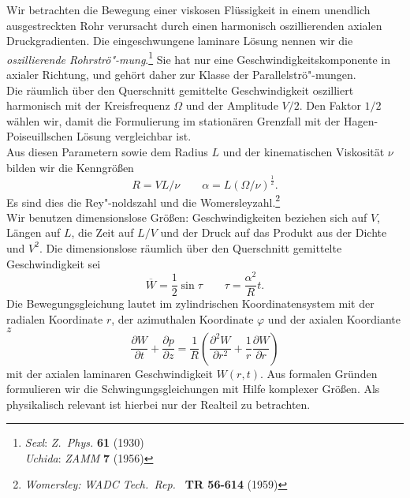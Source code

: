 \documentclass[10pt,a5paper,oneside,draft]{book}
\numberwithin{equation}{chapter}
\def\bibspace{\hspace*{18pt}}
\def\bibspace{\hspace*{21pt}}
\begin{document}
Wir betrachten die Bewegung einer viskosen Fl\"ussigkeit in einem unendlich ausgestreckten Rohr verursacht durch einen harmonisch oszillierenden axialen Druckgradienten.
Die eingeschwungene laminare L\"osung nennen wir die \textit{oszillierende Rohrstr\"o"-mung}.\footnote{\label{bib:sexl2}\textsl{Sexl}: \textit{Z.\ Phys.} \textbf{61} (1930)\\\bibspace\label{bib:uchida}\textsl{Uchida}: \textit{ZAMM} \textbf{7} (1956)} Sie hat nur eine Geschwindigkeitskomponente in axialer Richtung, und geh\"ort daher zur Klasse der Parallelstr\"o"-mungen.\\
Die r\"aumlich \"uber den Querschnitt gemittelte Geschwindigkeit oszilliert harmonisch mit der Kreisfrequenz $\Omega$ und der Amplitude $V/2$.
Den Faktor $1/2$ w\"ahlen wir, damit die Formulierung im station\"aren Grenzfall mit der Hagen-Poiseuillschen L\"osung vergleichbar ist.\\
Aus diesen Parametern sowie dem Radius $L$ und der kinematischen Viskosit\"at $\nu$ bilden wir die Kenngr\"o\ss en
\begin{equation}
	R = VL/\nu \qquad \alpha = L \left(\Omega/\nu\right)^{\frac{1}{2}}.
\end{equation}
Es sind dies die Rey"-noldszahl und die Womersleyzahl.\footnote{\label{bib:womersley_rep}\textsl{Womersley:} \textit{WADC Tech.\ Rep.\ } \textbf{TR 56-614} (1959)}\\
Wir benutzen dimensionslose Gr\"o\ss en: Geschwindigkeiten beziehen sich auf $V\!$, L\"angen auf $L$, die Zeit auf $L/V$ und der Druck auf das Produkt aus der Dichte und $V^2$.
Die dimensionslose r\"aumlich \"uber den Querschnitt gemittelte Geschwindigkeit sei
\begin{equation}\label{eq:baseflow-barV}
	\overline W = \frac{1}{2} \sin \tau \qquad \tau = \frac{\alpha^2}{R}t.
\end{equation}
Die Bewegungsgleichung lautet im zylindrischen Koordinatensystem mit der radialen Koordinate $r$, der azimuthalen Koordinate $\varphi$ und der axialen Koordiante $z$
\begin{equation}
	  \frac{\partial{W}}{\partial t} +  \frac{\partial{p}}{\partial z} = \frac{1}{R}\left(  \frac{\partial^{2}{W}}{\partial r^2} + \frac{1}{r}  \frac{\partial{W}}{\partial r} \right)
\end{equation}
mit der axialen laminaren Geschwindigkeit $W(r,t)$.
Aus formalen Gr\"unden formulieren wir die Schwingungsgleichungen mit Hilfe komplexer Gr\"o\ss en.
Als physikalisch relevant ist hierbei nur der Realteil zu betrachten.\\
\end{document}
